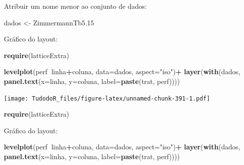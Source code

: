 \documentclass[
]{book}
\newenvironment{Shaded}{\begin{snugshade}}{\end{snugshade}}
\newcommand{\DataTypeTok}[1]{\textcolor[rgb]{0.13,0.29,0.53}{#1}}
\newcommand{\FloatTok}[1]{\textcolor[rgb]{0.00,0.00,0.81}{#1}}
\newcommand{\KeywordTok}[1]{\textcolor[rgb]{0.13,0.29,0.53}{\textbf{#1}}}
\newcommand{\NormalTok}[1]{#1}
\newcommand{\OperatorTok}[1]{\textcolor[rgb]{0.81,0.36,0.00}{\textbf{#1}}}
\newcommand{\StringTok}[1]{\textcolor[rgb]{0.31,0.60,0.02}{#1}}
\begin{document}
Atribuir um nome menor ao conjunto de dados:

\begin{Shaded}
\begin{Highlighting}[]
\NormalTok{dados <-}\StringTok{ }\NormalTok{ZimmermannTb5}\FloatTok{.15}
\end{Highlighting}
\end{Shaded}

Gráfico do layout:

\begin{Shaded}
\begin{Highlighting}[]
\KeywordTok{require}\NormalTok{(latticeExtra) }

\KeywordTok{levelplot}\NormalTok{(perf}\OperatorTok{~}\NormalTok{linha}\OperatorTok{+}\NormalTok{coluna, }
          \DataTypeTok{data=}\NormalTok{dados, }\DataTypeTok{aspect=}\StringTok{"iso"}\NormalTok{)}\OperatorTok{+}\StringTok{ }
\StringTok{          }\KeywordTok{layer}\NormalTok{(}\KeywordTok{with}\NormalTok{(dados, }
          \KeywordTok{panel.text}\NormalTok{(}\DataTypeTok{x=}\NormalTok{linha, }\DataTypeTok{y=}\NormalTok{coluna, }
          \DataTypeTok{label=}\KeywordTok{paste}\NormalTok{(trat, perf))))}
\end{Highlighting}
\end{Shaded}

\texttt{[image: TudodoR\_files/figure-latex/unnamed-chunk-391-1.pdf]}

\begin{Shaded}
\begin{Highlighting}[]
\KeywordTok{require}\NormalTok{(latticeExtra)}
\end{Highlighting}
\end{Shaded}

Gráfico do layout:

\begin{Shaded}
\begin{Highlighting}[]
\KeywordTok{levelplot}\NormalTok{(perf}\OperatorTok{~}\NormalTok{linha}\OperatorTok{+}\NormalTok{coluna, }
          \DataTypeTok{data=}\NormalTok{dados, }\DataTypeTok{aspect=}\StringTok{"iso"}\NormalTok{)}\OperatorTok{+}\StringTok{ }
\StringTok{          }\KeywordTok{layer}\NormalTok{(}\KeywordTok{with}\NormalTok{(dados, }
          \KeywordTok{panel.text}\NormalTok{(}\DataTypeTok{x=}\NormalTok{linha, }\DataTypeTok{y=}\NormalTok{coluna, }
          \DataTypeTok{label=}\KeywordTok{paste}\NormalTok{(trat, perf))))}
\end{Highlighting}
\end{Shaded}
\end{document}
